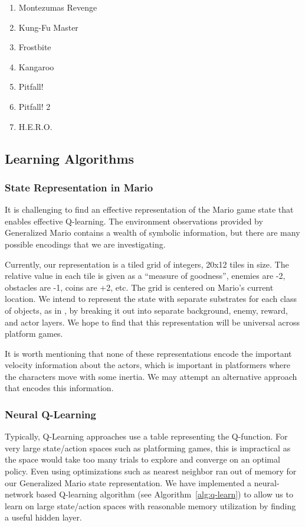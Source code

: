 \documentclass{article}
\begin{document}
\begin{multicols}{2}
\begin{enumerate} [topsep=0pt,itemsep=-1ex,partopsep=1ex,parsep=1ex]
\item Montezumas Revenge
\item Kung-Fu Master
\item Frostbite
\item Kangaroo
\item Pitfall!
\item Pitfall! 2
\item H.E.R.O.
\end{enumerate}
\end{multicols}

\subsection{Learning Algorithms}

\subsubsection{State Representation in Mario}
It is challenging to find an effective representation of the Mario game state that enables effective Q-learning. The environment observations provided by Generalized Mario contains a wealth of symbolic information, but there are many possible encodings that we are investigating.

Currently, our representation is a tiled grid of integers, 20x12 tiles in size. The relative value in each tile is given as a ``measure of goodness'', enemies are -2, obstacles are -1, coins are +2, etc. The grid is centered on Mario's current location. We intend to represent the state with separate substrates for each class of objects, as in \cite{Hauskneck13}, by breaking it out into separate background, enemy, reward, and actor layers. We hope to find that this representation will be universal across platform games. 

It is worth mentioning that none of these representations encode the important velocity information about the actors, which is important in platformers where the characters move with some inertia. We may attempt an alternative approach that encodes this information.

\subsubsection{Neural Q-Learning}

Typically, Q-Learning approaches use a table representing the Q-function. For very large state/action spaces such as platforming games, this is impractical as the space would take too many trials to explore and converge on an optimal policy. Even using optimizations such as nearest neighbor ran out of memory for our Generalized Mario state representation. We have implemented a neural-network based Q-learning algorithm (see Algorithm~\ref{alg:q-learn}) to allow us to learn on large state/action spaces with reasonable memory utilization by finding a useful hidden layer. 
\end{document}
